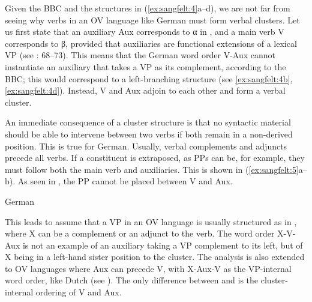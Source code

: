 \documentclass[output=paper, colorlinks, citecolor=brown]{langscibook}
\begin{document}
         

Given the BBC and the structures in (\ref{ex:sangfelt:4}a–d), we are not far from seeing why verbs in an OV language like German must form verbal clusters. Let us first state that an auxiliary Aux corresponds to α in , and a main verb V corresponds to β, provided that auxiliaries are functional extensions of a lexical VP (see \citealt{Haider2013}: 68–73). This means that the German word order V-Aux cannot instantiate an auxiliary that takes a VP as its complement, according to the BBC; this would correspond to a left-branching structure (see \ref{ex:sangfelt:4b}, \ref{ex:sangfelt:4d}). Instead, V and Aux adjoin to each other and form a verbal cluster.

An immediate consequence of a cluster structure is that no syntactic material should be able to intervene between two verbs if both remain in a non-derived position. This is true for German. Usually, verbal complements and adjuncts precede all verbs. If a constituent is extraposed, as PPs can be, for example, they must follow both the main verb and auxiliaries. This is shown in (\ref{ex:sangfelt:5}a–b). As seen in , the PP cannot be placed between V and Aux.


\ea German\label{ex:sangfelt:5}

\z 
\z 

This leads \textcites{Haider2003}[17–18, 335–343]{Haider2010}[90–93, 132–135]{Haider2013} to assume that a VP in an OV language is usually structured as in , where X can be a complement or an adjunct to the verb. The word order X-V-Aux is not an example of an auxiliary taking a VP complement to its left, but of X being in a left-hand sister position to the cluster. The analysis is also extended to OV languages where Aux can precede V, with X-Aux-V as the VP-internal word order, like Dutch (see \cites[341–343]{Haider2010}[133]{Haider2013}). The only difference between  and  is the cluster-internal ordering of V and Aux.
\end{document}
